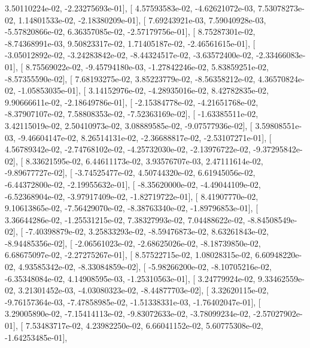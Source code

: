 \documentclass{article}
\begin{document}
          3.50110224e-02,  -2.23275693e-01],
       [  4.57593583e-02,  -4.62621072e-03,   7.53078273e-02,
          1.14801533e-02,  -2.18380209e-01],
       [  7.69243921e-03,   7.59040928e-03,  -5.57820866e-02,
          6.36357085e-02,  -2.57179756e-01],
       [  8.75287301e-02,  -8.74368991e-03,   9.50823317e-02,
          1.71405187e-02,  -2.46561615e-01],
       [ -3.05012892e-02,  -3.24283842e-02,  -8.44324517e-02,
         -3.63572400e-02,  -2.33466083e-01],
       [  8.75569022e-02,  -9.45794180e-03,  -1.27842246e-02,
          5.83859251e-02,  -8.57355590e-02],
       [  7.68193275e-02,   3.85223779e-02,  -8.56358212e-02,
          4.36570824e-02,  -1.05853035e-01],
       [  3.14152976e-02,  -4.28935016e-02,   8.42782835e-02,
          9.90666611e-02,  -2.18649786e-01],
       [ -2.15384778e-02,  -4.21651768e-02,  -8.37907107e-02,
          7.58808353e-02,  -7.52363169e-02],
       [ -1.63385511e-02,   3.42115019e-02,   2.50410973e-02,
          3.08889585e-02,  -9.07577936e-02],
       [  3.59808551e-03,  -9.46604147e-02,   8.26514131e-02,
         -2.36688817e-02,  -2.53107271e-01],
       [  4.56789342e-02,  -2.74768102e-02,  -4.25732030e-02,
         -2.13976722e-02,  -9.37295842e-02],
       [  8.33621595e-02,   6.44611173e-02,   3.93576707e-03,
          2.47111614e-02,  -9.89677727e-02],
       [ -3.74525477e-02,   4.50744320e-02,   6.61945056e-02,
         -6.44372800e-02,  -2.19955632e-01],
       [ -8.35620000e-02,  -4.49044109e-02,  -6.52368904e-02,
         -3.97917409e-02,  -1.82719722e-01],
       [  8.41907770e-02,   9.10613865e-02,  -7.56429070e-02,
         -8.38763340e-02,  -1.89796853e-01],
       [  3.36644286e-02,  -1.25531215e-02,   7.38327993e-02,
          7.04488622e-02,  -8.84508549e-02],
       [ -7.40398879e-02,   3.25833293e-02,  -8.59476873e-02,
          8.63261843e-02,  -8.94485356e-02],
       [ -2.06561023e-02,  -2.68625026e-02,  -8.18739850e-02,
          6.68675097e-02,  -2.27275267e-01],
       [  8.57522715e-02,   1.08028315e-02,   6.60948220e-02,
          4.93585342e-02,  -8.33084859e-02],
       [ -5.98266200e-02,  -8.10705216e-02,  -6.35348084e-02,
          4.14908595e-03,  -1.25310563e-01],
       [  3.24779924e-02,   9.33462559e-02,   3.21301452e-03,
         -4.03080323e-02,  -8.44877703e-02],
       [  3.32620115e-02,  -9.76157364e-03,  -7.47858985e-02,
         -1.51338331e-03,  -1.76402047e-01],
       [  3.29005890e-02,  -7.15414113e-02,  -9.83072633e-02,
         -3.78099234e-02,  -2.57027902e-01],
       [  7.53483717e-02,   4.23982250e-02,   6.66041152e-02,
          5.60775308e-02,  -1.64253485e-01],
\end{document}
